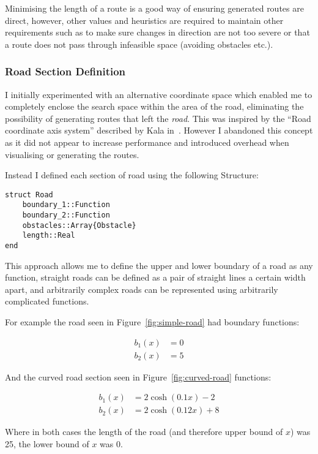 Minimising the length of a route is a good way of ensuring generated routes are direct, however, other values and heuristics are required to maintain other requirements such as to make sure changes in direction are not too severe or that a route does not pass through infeasible space (avoiding obstacles etc.).

\subsubsection{Road Section Definition}

I initially experimented with an alternative coordinate space which enabled me to completely enclose the search space within the area of the road, eliminating the possibility of generating routes that left the \textit{road}. This was inspired by the ``Road coordinate axis system'' described by Kala in~\cite{kalaOptimizationBasedPlanning2016}. However I abandoned this concept as it did not appear to increase performance and introduced overhead when visualising or generating the routes.

Instead I defined each section of road using the following Structure:

\begin{verbatim}
struct Road
    boundary_1::Function
    boundary_2::Function
    obstacles::Array{Obstacle}
    length::Real
end
\end{verbatim}

This approach allows me to define the upper and lower boundary of a road as any function, straight roads can be defined as a pair of straight lines a certain width apart, and arbitrarily complex roads can be represented using arbitrarily complicated functions.

For example the road seen in Figure~\ref{fig:simple-road} had boundary functions:

\begin{align*}
  b_{1}(x) &= 0 \\
  b_{2}(x) &= 5
\end{align*}

And the curved road section seen in Figure~\ref{fig:curved-road} functions:

\begin{align*}
  b_{1}(x) &= 2\cosh (0.1x)-2 \\
  b_{2}(x) &= 2\cosh(0.12x)+8
\end{align*}

Where in both cases the length of the road (and therefore upper bound of $x$) was 25, the lower bound of $x$ was 0.

